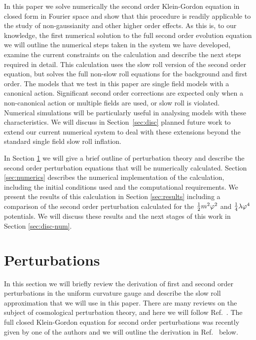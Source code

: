 In this paper we 
solve numerically the second order Klein-Gordon
equation in closed form in Fourier space and show that this procedure
is readily applicable to the study of non-gaussianity and other higher
order effects.
%
As this is, to our knowledge, the first numerical solution to the full
second order evolution equation we will outline the numerical steps
taken in the system we have developed, examine the current constraints
on the calculation and describe the next steps required in
detail. This calculation uses the slow roll version of the second
order equation, but solves the full non-slow roll equations for the
background and first order.
% 
The models that we test in this paper are single field models with a canonical
action. Significant second order corrections
are expected only when a non-canonical action or multiple fields are
used, or slow roll is violated. Numerical simulations will be particularly
useful in analysing models with these characteristics.
We will discuss in
Section~\ref{sec:disc} planned future work to extend our current numerical
system to deal with these extensions beyond the standard single field slow roll
inflation.


In Section \ref{sec:perts-num} we will give a brief outline of
perturbation theory and describe the second order perturbation
equations that will be numerically calculated. Section
\ref{sec:numerics} describes the numerical implementation of the
calculation, including the initial conditions used and the
computational requirements. We present the results of this calculation
in Section \ref{sec:results} including a comparison of the second
order perturbation calculated for the $\frac{1}{2} m^2 \varphi^2$ and
$\frac{1}{4}\lambda\varphi^4$ potentials. We will discuss these results
and the next stages of this work in Section \ref{sec:disc-num}. 



% 
% 
% 
% 
\section{Perturbations}
\label{sec:perts-num}


In this section we will briefly review the derivation of first and
second order perturbations in the uniform curvature gauge and describe
the slow roll approximation that we will use in this paper. There are
many reviews on the subject of cosmological perturbation theory, and
here we will follow Ref.~\cite{Malik:2008im}.  The full closed
Klein-Gordon equation for second order perturbations was recently
given by one of the authors and we will outline the derivation in
Ref.~\cite{Malik:2006ir} below.

